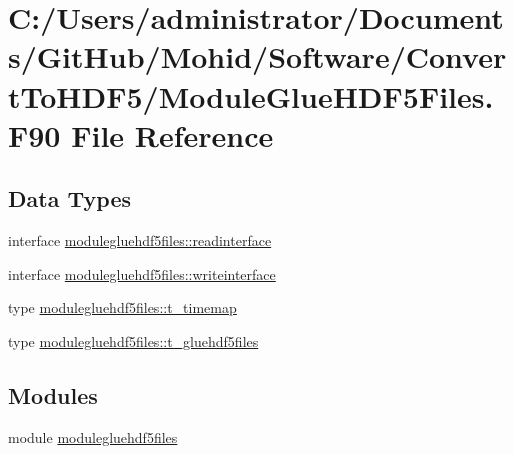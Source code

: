 \hypertarget{_module_glue_h_d_f5_files_8_f90}{}\section{C\+:/\+Users/administrator/\+Documents/\+Git\+Hub/\+Mohid/\+Software/\+Convert\+To\+H\+D\+F5/\+Module\+Glue\+H\+D\+F5\+Files.F90 File Reference}
\label{_module_glue_h_d_f5_files_8_f90}
\subsection*{Data Types}
\begin{DoxyCompactItemize}
\item 
interface \mbox{\hyperlink{interfacemodulegluehdf5files_1_1readinterface}{modulegluehdf5files\+::readinterface}}
\item 
interface \mbox{\hyperlink{interfacemodulegluehdf5files_1_1writeinterface}{modulegluehdf5files\+::writeinterface}}
\item 
type \mbox{\hyperlink{structmodulegluehdf5files_1_1t__timemap}{modulegluehdf5files\+::t\+\_\+timemap}}
\item 
type \mbox{\hyperlink{structmodulegluehdf5files_1_1t__gluehdf5files}{modulegluehdf5files\+::t\+\_\+gluehdf5files}}
\end{DoxyCompactItemize}
\subsection*{Modules}
\begin{DoxyCompactItemize}
\item 
module \mbox{\hyperlink{namespacemodulegluehdf5files}{modulegluehdf5files}}
\end{DoxyCompactItemize}
